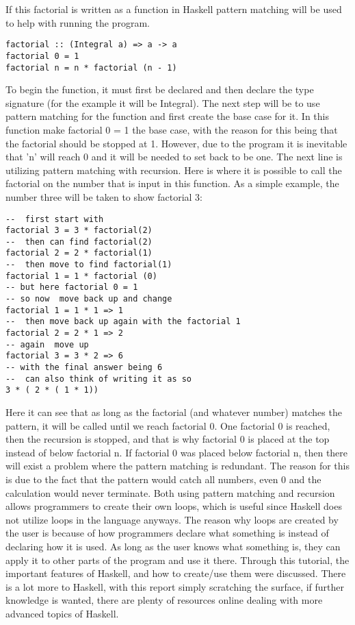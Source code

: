 \documentclass{article}
\begin{document}
If this factorial is written as a function in Haskell  pattern matching will be used to help with running the program.
\begin{lstlisting}
factorial :: (Integral a) => a -> a
factorial 0 = 1
factorial n = n * factorial (n - 1)
\end{lstlisting}
To begin the function, it must first be declared and then declare the type signature (for the example it will be Integral).
The next step will be to use pattern matching for the function and first create the base case for it.
In this function make factorial 0 = 1 the base case, with the reason for this being that the factorial should be stopped at 1.
However, due to the program it is inevitable that 'n' will reach 0 and it will be needed to set back to be one.
The next line is  utilizing pattern matching with recursion.
Here is where it is possible to call the factorial on the number that is input in this function.
As a simple example, the number three will be taken to show factorial 3:
\begin{lstlisting}
--  first start with
factorial 3 = 3 * factorial(2)
--  then can find factorial(2)
factorial 2 = 2 * factorial(1)
--  then move to find factorial(1)
factorial 1 = 1 * factorial (0)
-- but here factorial 0 = 1
-- so now  move back up and change 
factorial 1 = 1 * 1 => 1
--  then move back up again with the factorial 1
factorial 2 = 2 * 1 => 2
-- again  move up
factorial 3 = 3 * 2 => 6
-- with the final answer being 6
--  can also think of writing it as so
3 * ( 2 * ( 1 * 1))
\end{lstlisting}
Here it can see that as long as the factorial (and whatever number) matches the pattern, it will be called until we reach factorial 0.
One factorial 0 is reached, then the recursion is stopped, and that is why factorial 0 is placed at the top instead of below factorial n.
If factorial 0 was placed below factorial n, then there will exist a problem where the pattern matching is redundant.
The reason for this is due to the fact that the pattern would catch all numbers, even 0 and the calculation would never terminate.
Both using pattern matching and recursion allows programmers to create their own loops, which is useful since Haskell does not utilize loops in the language anyways.
The reason why loops are created by the user is because of how programmers declare what something is instead of declaring how it is used.
As long as the user knows what something is, they can apply it to other parts of the program and use it there.
Through this tutorial, the important features of Haskell, and how to create/use them were discussed.
There is a lot more to Haskell, with this report simply scratching the surface, if further knowledge is wanted, there are plenty of resources online dealing with more advanced topics of Haskell.
\end{document}
